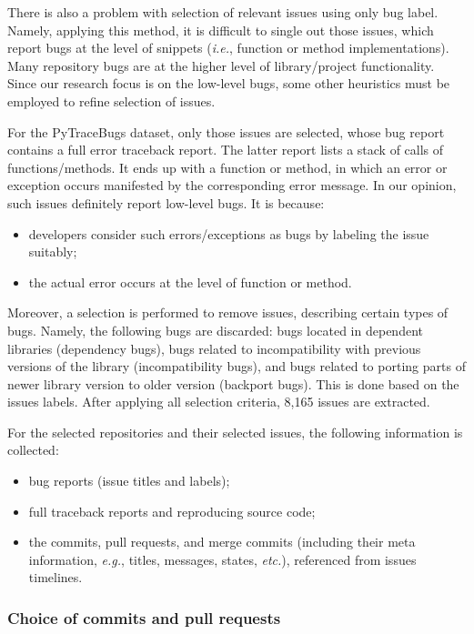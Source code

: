 \documentclass[10pt,conference]{IEEEtran}
\begin{document}
There is also a problem with selection of relevant issues using only bug label. 
Namely, applying this method, it is difficult to single out those issues, which report bugs at the level of snippets (\textit{i.e.}, function or method implementations).
Many repository bugs are at the higher level of library/project functionality.
Since our research focus is on the low-level bugs, some other heuristics must be employed to refine selection of issues.

For the PyTraceBugs dataset, only those issues are selected, whose bug report contains a full error traceback report.
The latter report lists a stack of calls of functions/methods. It ends up with a function or method, in which an error or exception occurs
manifested by the corresponding error message. In our opinion, such issues definitely report low-level bugs. It is because:
\begin{itemize}
\item developers consider such errors/exceptions as bugs by labeling the issue suitably;

\item the actual error occurs at the level of function or method.
\end{itemize}

Moreover, a selection is performed to remove issues, describing certain types of bugs. Namely, the following bugs are discarded: bugs located in dependent libraries
(dependency bugs), bugs related to incompatibility with previous versions of the library (incompatibility bugs), and bugs related to porting parts of newer library version to older version (backport bugs).
This is done based on the issues labels. After applying all selection criteria, 8,165 issues are extracted. 

For the selected repositories and their selected issues, the following information is collected:
\begin{itemize}
\item bug reports (issue titles and labels);

\item full traceback reports and reproducing source code;

\item the commits, pull requests, and merge commits (including their meta information, \textit{e.g.}, titles, messages, states, \textit{etc.}), referenced from issues timelines.
\end{itemize}


\subsubsection{Choice of commits and pull requests}
\end{document}
